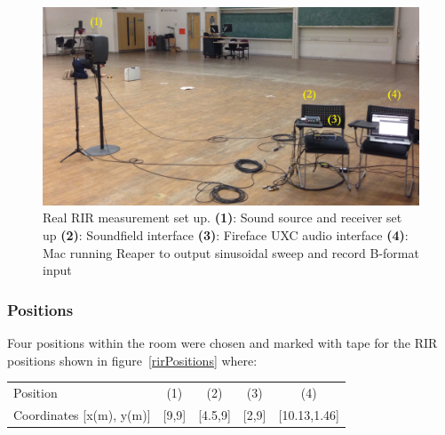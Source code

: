 \documentclass[../../main.tex]{subfiles}
\begin{document}
		\begin{figure}[ht]
			\begin{center}
				\includegraphics[scale = 0.14]{Sections/Implementation/RealRIRs/images/realRIRSetup_edit.jpg} 
				\caption{Real \ac{RIR} measurement set up. \textbf{(1)}: Sound source and receiver set up \textbf{(2)}: Soundfield interface \textbf{(3)}: Fireface UXC audio interface \textbf{(4)}: Mac running Reaper to output sinusoidal sweep and record B-format input}
				\label{realRIRSetup}
			\end{center}
		\end{figure}

	\subsubsection{Positions}

		Four positions within the room were chosen and marked with tape for the \ac{RIR} positions shown in figure~\ref{rirPositions} where:

		\begin{center}
			\begin{tabular}{l| c c c c}
				Position & (1) & (2) & (3) & (4) \\
			Coordinates [x(m), y(m)] & [9,9] & [4.5,9] & [2,9] &  [10.13,1.46]\\
			\end{tabular}
		\end{center}
\end{document}
